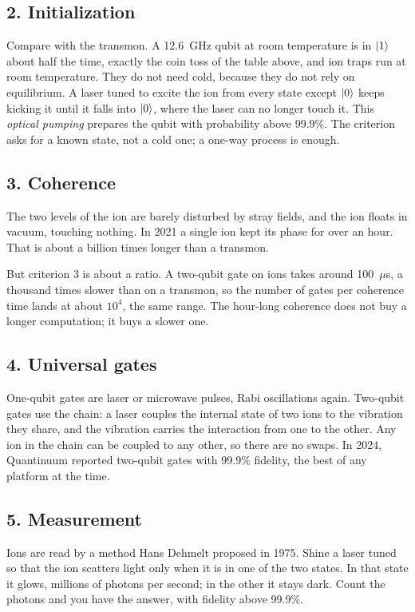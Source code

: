 \subsection*{2. Initialization}

Compare with the transmon. A 12.6~GHz qubit at room temperature is in $\ket1$ about half the
time, exactly the coin toss of the table above, and ion traps run at room temperature. They
do not need cold, because they do not rely on equilibrium. A laser tuned to excite the ion
from every state except $\ket0$ keeps kicking it until it falls into $\ket0$, where the laser
can no longer touch it. This \emph{optical pumping} prepares the qubit with probability above
99.9\%. The criterion asks for a known state, not a cold one; a one-way process is enough.

\subsection*{3. Coherence}

The two levels of the ion are barely disturbed by stray fields, and the ion floats in vacuum,
touching nothing. In 2021 a single ion kept its phase for over an hour. That is about a
billion times longer than a transmon.

But criterion 3 is about a ratio. A two-qubit gate on ions takes around 100~$\mu$s, a
thousand times slower than on a transmon, so the number of gates per coherence time lands at
about $10^4$, the same range. The hour-long coherence does not buy a longer computation; it
buys a slower one.

\subsection*{4. Universal gates}

One-qubit gates are laser or microwave pulses, Rabi oscillations again. Two-qubit gates use
the chain: a laser couples the internal state of two ions to the vibration they share, and
the vibration carries the interaction from one to the other. Any ion in the chain can be
coupled to any other, so there are no swaps. In 2024, Quantinuum reported two-qubit gates
with 99.9\% fidelity, the best of any platform at the time.

\subsection*{5. Measurement}

Ions are read by a method Hans Dehmelt proposed in 1975. Shine a laser tuned so that the ion
scatters light only when it is in one of the two states. In that state it glows, millions of
photons per second; in the other it stays dark. Count the photons and you have the answer,
with fidelity above 99.9\%.

